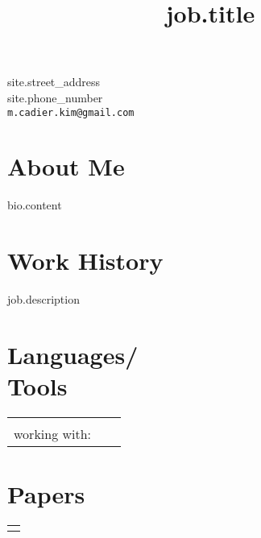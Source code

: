 \documentclass[margin,line,pifont,palatino,courier]{res}
\newenvironment{list1}{
  \begin{list}{\label{ } }{
      \setlength{\itemsep}{0in}
      \setlength{\parsep}{0in} \setlength{\parskip}{0in}
      \setlength{\topsep}{0in} \setlength{\partopsep}{0in}
      \setlength{\leftmargin}{0.0in} } }{\end{list} }
\begin{document}


\begin{resume}




\begin{flushright}
{\small
{{site.street_address}} \\
{{site.phone_number}}\\
  \verb+m.cadier.kim@gmail.com+
}
\end{flushright}
 
\section{\sc  About Me}
    {%
      {%
          {%
            {{ bio.content }}
          {%
      {%


\section{\sc  Work History}
  {%
  {%
    \title{ {{job.title}}  }

    \begin{position}
    {{ job.description }}
    \end{position}
  {%

\section{\sc Languages/ \\ Tools}

  \begin{tabular}{@{}p{6in}p{3in}}

    {%
    \\working with: \ 
    {%

  \end{tabular}


\section{\sc Papers}
  \begin{tabular}{@{}p{5in}}
    \begin{list1}
      {%
      {%
        \item {\em {{paper.title}}}, {%
      \vspace{.2em}
      {%
    \end{list1}
  \end{tabular}


}}}}}}}}
\end{resume}
\end{document}
